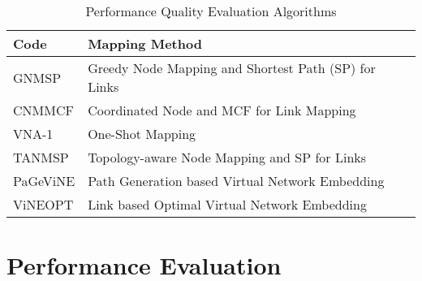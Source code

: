\documentclass[journal]{IEEEtran}
\begin{document}
\begin{table}[t!]
\renewcommand{\arraystretch}{1.5}
\caption{Performance Quality Evaluation Algorithms}
\label{table1}
\centering
{}
\begin{tabular}{l||l}
\hline
\bfseries Code & \bfseries Mapping Method\\
\hline\hline
GNMSP & Greedy Node Mapping and Shortest Path (SP) for Links\cite{Yu08}\\
CNMMCF & Coordinated Node and MCF for Link Mapping\cite{Chowdhury12}\\
VNA-1  & One-Shot Mapping\cite{Zhu06}\\
TANMSP & Topology-aware Node Mapping and SP for Links \cite{ChengXiang2011} \\
PaGeViNE & Path Generation based Virtual Network Embedding\\
ViNEOPT & Link based Optimal Virtual Network Embedding\\
\hline
\end{tabular}
\end{table}


\section{Performance Evaluation}
\end{document}
